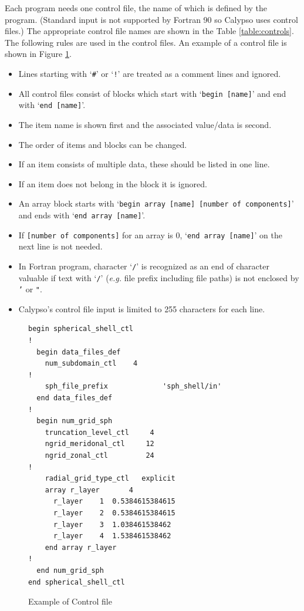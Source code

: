 Each program needs one control file, the name of which is defined by the program.
 (Standard input is not supported by Fortran 90 so Calypso uses control files.)
The appropriate control file names are shown in the Table \ref{table:controls}. 
The following rules are used in the control files. An example of a control file is shown in Figure \ref{fig:control_example}.
%
\begin{itemize}
\item Lines starting with `\verb|#|' or `\verb|!|' are treated as a comment lines and ignored. 
\item All control files consist of blocks which start with `\verb|begin [name]|' and end with `\verb|end [name]|'.
\item The item name is shown first and the associated value/data is second.
\item The order of items and blocks can be changed.
\item If an item consists of multiple data, these should be listed in one line.
\item If an item does not belong in the block it is ignored.
\item An array block starts with `\verb|begin array [name] [number of components]|' and ends with `\verb|end array [name]|'.
\item If \verb|[number of components]| for an array is 0, `\verb|end array [name]|' on the next line is not needed.
\item In Fortran program, character `\verb|/|' is recognized as an end of character valuable if text with `\verb|/|' ({\it e.g.} file prefix including file paths) is not enclosed by {\tt '} or {\tt "}.
\item Calypso's control file input is limited to 255 characters for each line.
\end{itemize}
%
\begin{figure}[htbp]
\begin{center}
%
\begin{verbatim}
begin spherical_shell_ctl
!
  begin data_files_def
    num_subdomain_ctl    4
!
    sph_file_prefix             'sph_shell/in'
  end data_files_def
!
  begin num_grid_sph
    truncation_level_ctl     4
    ngrid_meridonal_ctl     12
    ngrid_zonal_ctl         24
!
    radial_grid_type_ctl   explicit
    array r_layer       4
      r_layer    1  0.5384615384615
      r_layer    2  0.5384615384615
      r_layer    3  1.038461538462
      r_layer    4  1.538461538462
    end array r_layer
!
  end num_grid_sph
end spherical_shell_ctl
\end{verbatim}
%
\caption{Example of Control file}
\label{fig:control_example}
\end{center}
\end{figure}
%

